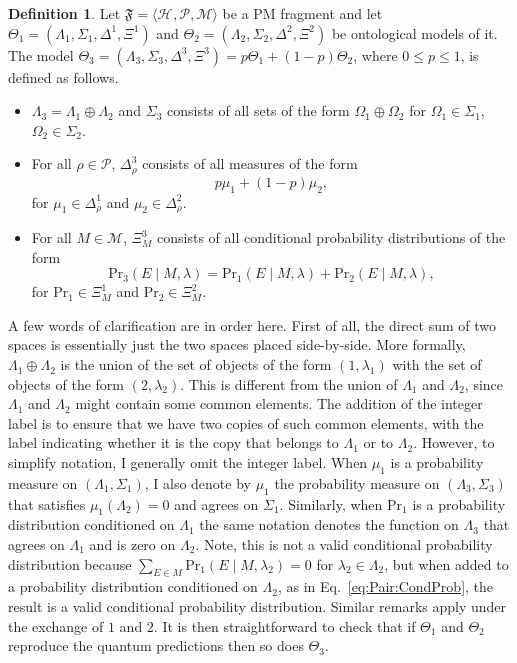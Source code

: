 \documentclass[DIV=calc,paper=a4,fontsize=11pt,twocolumn]{scrartcl} %
\theoremstyle{definition}
\newtheorem{definition}{Definition}[section]
\theoremstyle{plain}
\newcommand{\Hilb}[1][]{\ensuremath{\mathcal{H}_{#1}}}
\begin{document}
\begin{definition}
Let $\mathfrak{F} = \langle \Hilb, \mathcal{P}, \mathcal{M} \rangle$
be a PM fragment and let $\Theta_1 = (\Lambda_1, \Sigma_1, \Delta^1,
\Xi^1)$ and $\Theta_2 = (\Lambda_2, \Sigma_2, \Delta^2, \allowbreak
\Xi^2)$ be ontological models of it.  The model $\Theta_3 =
(\Lambda_3, \Sigma_3, \Delta^3, \Xi^3) = p\Theta_1 + (1-p)\Theta_2$,
where $0 \leq p \leq 1$, is defined as follows.
\begin{itemize}
\item $\Lambda_3 = \Lambda_1 \oplus \Lambda_2$ and $\Sigma_3$
consists of all sets of the form $\Omega_1 \oplus \Omega_2$ for
$\Omega_1 \in \Sigma_1$, $\Omega_2 \in \Sigma_2$.
\item For all $\rho \in \mathcal{P}$, $\Delta^3_{\rho}$ consists of
all measures of the form
\begin{equation}
p \mu_1 + (1-p) \mu_2,
\end{equation}
for $\mu_1 \in \Delta^1_{\rho}$ and $\mu_2 \in \Delta^2_{\rho}$.
\item For all $M \in \mathcal{M}$, $\Xi^3_M$ consists of all
conditional probability distributions of the form
\begin{equation}
\label{eq:Pair:CondProb}
\text{Pr}_3 \left ( E \middle | M, \lambda \right ) =
\text{Pr}_1 \left ( E \middle | M, \lambda \right ) +
\text{Pr}_2 \left ( E \middle | M, \lambda \right ),
\end{equation}
for $\text{Pr}_1 \in \Xi^1_M$ and $\text{Pr}_2 \in \Xi^2_M$.
\end{itemize}
\end{definition}

A few words of clarification are in order here.  First of all, the
direct sum of two spaces is essentially just the two spaces placed
side-by-side.  More formally, $\Lambda_1 \oplus \Lambda_2$ is the
union of the set of objects of the form $(1,\lambda_1)$ with the set
of objects of the form $(2,\lambda_2)$.  This is different from the
union of $\Lambda_1$ and $\Lambda_2$, since $\Lambda_1$ and
$\Lambda_2$ might contain some common elements.  The addition of the
integer label is to ensure that we have two copies of such common
elements, with the label indicating whether it is the copy that
belongs to $\Lambda_1$ or to $\Lambda_2$.  However, to simplify
notation, I generally omit the integer label.  When $\mu_1$ is a
probability measure on $(\Lambda_1,\Sigma_1)$, I also denote by
$\mu_1$ the probability measure on $(\Lambda_3,\Sigma_3)$ that
satisfies $\mu_1(\Lambda_2) = 0$ and agrees on $\Sigma_1$.  Similarly,
when $\text{Pr}_1$ is a probability distribution conditioned on
$\Lambda_1$ the same notation denotes the function on $\Lambda_3$ that
agrees on $\Lambda_1$ and is zero on $\Lambda_2$.  Note, this is not a
valid conditional probability distribution because $\sum_{E \in M}
\text{Pr}_1 \left ( E \middle | M, \lambda_2 \right ) = 0$ for
$\lambda_2 \in \Lambda_2$, but when added to a probability
distribution conditioned on $\Lambda_2$, as in
Eq.~\eqref{eq:Pair:CondProb}, the result is a valid conditional
probability distribution.  Similar remarks apply under the exchange of
$1$ and $2$.  It is then straightforward to check that if $\Theta_1$
and $\Theta_2$ reproduce the quantum predictions then so does
$\Theta_3$.
\end{document}
